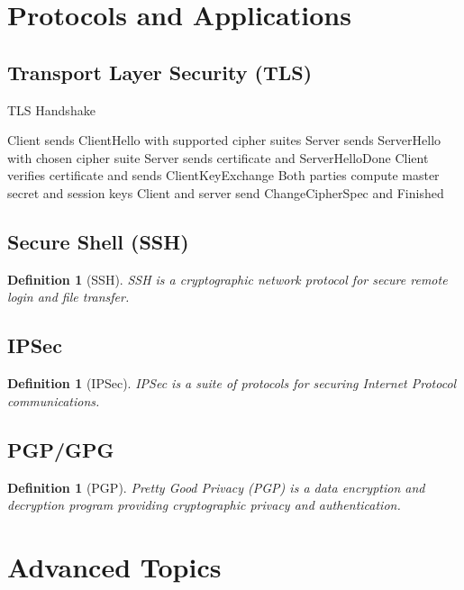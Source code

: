 \documentclass[11pt,a4paper]{article}
\newtheorem{definition}[theorem]{Definition}
\begin{document}
\section{Protocols and Applications}

\subsection{Transport Layer Security (TLS)}

\begin{algorithm}
\caption{TLS Handshake}
\begin{algorithmic}[1]
\STATE Client sends ClientHello with supported cipher suites
\STATE Server sends ServerHello with chosen cipher suite
\STATE Server sends certificate and ServerHelloDone
\STATE Client verifies certificate and sends ClientKeyExchange
\STATE Both parties compute master secret and session keys
\STATE Client and server send ChangeCipherSpec and Finished
\end{algorithmic}
\end{algorithm}

\subsection{Secure Shell (SSH)}

\begin{definition}[SSH]
SSH is a cryptographic network protocol for secure remote login and file transfer.
\end{definition}

\subsection{IPSec}

\begin{definition}[IPSec]
IPSec is a suite of protocols for securing Internet Protocol communications.
\end{definition}

\subsection{PGP/GPG}

\begin{definition}[PGP]
Pretty Good Privacy (PGP) is a data encryption and decryption program providing cryptographic privacy and authentication.
\end{definition}

\section{Advanced Topics}
\end{document}
